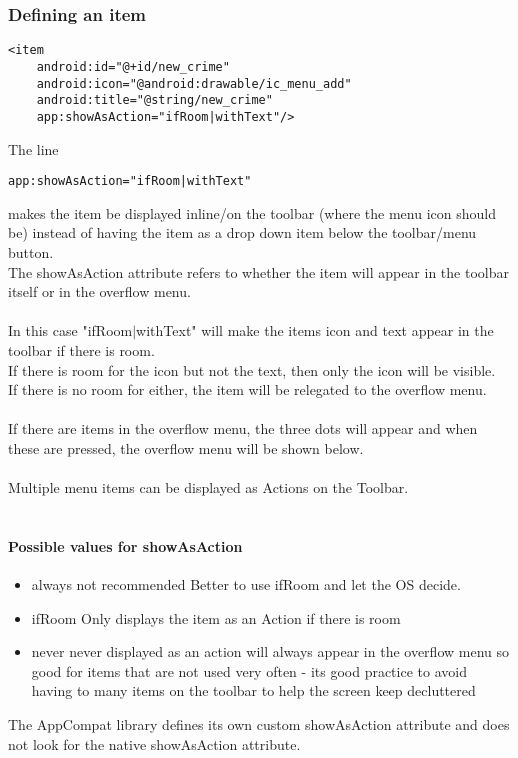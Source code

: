 \documentclass[]{article}
\begin{document}
\subsubsection{Defining an item}
\begin{lstlisting}
<item
	android:id="@+id/new_crime"
	android:icon="@android:drawable/ic_menu_add"
	android:title="@string/new_crime"
	app:showAsAction="ifRoom|withText"/>
\end{lstlisting}
The line 
\begin{lstlisting}
app:showAsAction="ifRoom|withText"
\end{lstlisting}
makes the item be displayed inline/on the toolbar (where the menu icon should be) instead of having the item as a drop down item below the toolbar/menu button.
\\
The showAsAction attribute refers to whether the item will appear in the toolbar itself or in the overflow menu.
\\\\
In this case "ifRoom$|$withText" will make the items icon and text appear in the toolbar if there is room.  
\\If there is room for the icon but not the text, then only the icon will be visible. 
\\If there is no room for either, the item will be relegated to the overflow menu.
\\\\
If there are items in the overflow menu, the three dots will appear and when these are pressed, the overflow menu will be shown below.
\\\\
Multiple menu items can be displayed as Actions on the Toolbar.
\\\\
\paragraph{Possible values for showAsAction}
\begin{itemize}
	\item always 
	\subitem not recommended 
	\subitem Better to use ifRoom and let the OS decide.
	
	\item ifRoom
	\subitem Only displays the item as an Action if there is room
	
	\item never
	\subitem never displayed as an action
	\subitem will always appear in the overflow menu
	\subitem so good for items that are not used very often - its good practice to avoid having to many items on the toolbar to help the screen keep decluttered 
\end{itemize}
The AppCompat library defines its own custom showAsAction attribute and does not look for the native showAsAction attribute.
\end{document}
